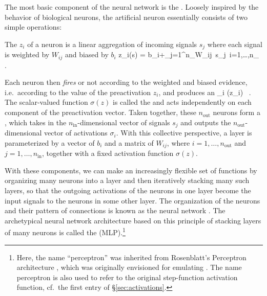 The most basic component of the neural network is the . Loosely inspired by the behavior of biological neurons, the artificial neuron essentially consists of two simple operations:
\bi
\item The  $z_i$ of a neuron is a linear aggregation of 
incoming signals $s_j$ where each signal is weighted by $W_{ij}$ and
biased by $b_i$
\be\label{eq:preactivation}
z_{i}(s) = b_i+\sum_{j=1}^{n_{}}W_{ij}\, s_{j}\,  \quad {} \quad i=1,\ldots,n_{}\, .
\ee
\item Each neuron then \emph{fires} or not according to the weighted and biased evidence, i.e.~according to the value of the preactivation $z_i$, and produces an 
\be
\sigma_i \equiv \sigma\!\le(z_{i}\ri) \, .
\ee
The scalar-valued function $\sigma(z)$ is called the  and acts independently on each component of the preactivation vector.
\ei
Taken together, these  $n_{\text{out}}$ neurons form a , which takes in the $n_{\text{in}}$-dimensional vector of signals $s_j$ and outputs the $n_{\text{out}}$-dimensional vector of  activations $\sigma_i$.   With this collective perspective, a layer is parameterized by a vector of  $b_i$ and a matrix of  $W_{ij}$, where $i=1,\ldots,n_{\text{out}}$ and $j=1,\ldots,n_{\text{in}}$, together with a fixed activation function $\sigma(z)$.

With these components, we can make an increasingly flexible set of functions by organizing many neurons into a layer and then iteratively stacking many such layers, so that the outgoing activations of the neurons in one layer become the input signals to the neurons in some other layer.
The organization of the neurons and their pattern of connections is known as the neural network .
The archetypical neural network architecture based on this principle of stacking 
layers of many neurons is called the  (MLP).\footnote{Here, the name ``perceptron'' was inherited from Rosenblatt's Perceptron architecture \cite{rosenblatt1958perceptron}, which was originally envisioned for emulating . The name perceptron is also used to refer to the original step-function activation function, cf.~the first entry of \S\ref{sec:activations}. 
} 

